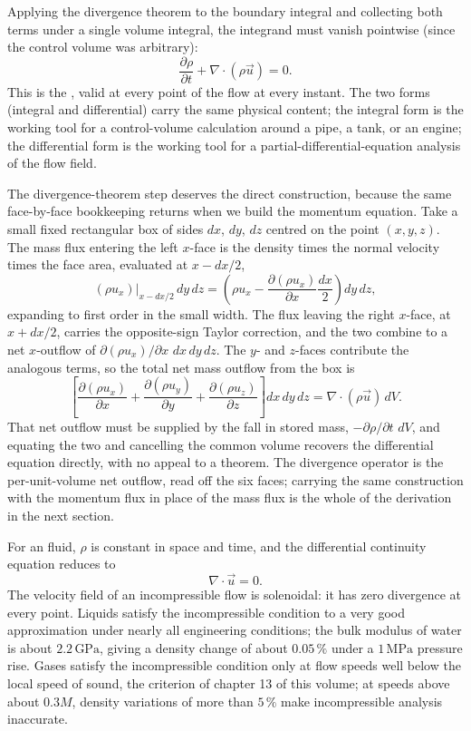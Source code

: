 Applying the divergence theorem to the boundary integral and
collecting both terms under a single volume integral, the integrand
must vanish pointwise (since the control volume was arbitrary):
\[
\frac{\partial \rho}{\partial t} + \nabla\cdot(\rho\vec{u}) = 0.
\]
This is the , valid at
every point of the flow at every instant. The two forms (integral
and differential) carry the same physical content; the integral
form is the working tool for a control-volume calculation around a
pipe, a tank, or an engine; the differential form is the working
tool for a partial-differential-equation analysis of the flow
field.

The divergence-theorem step deserves the direct construction, because
the same face-by-face bookkeeping returns when we build the momentum
equation. Take a small fixed rectangular box of sides $dx$, $dy$, $dz$
centred on the point $(x,y,z)$. The mass flux entering the left
$x$-face is the density times the normal velocity times the face area,
evaluated at $x - dx/2$,
\[
\left(\rho u_x\right)\Big|_{x-dx/2}\,dy\,dz
= \left(\rho u_x - \frac{\partial(\rho u_x)}{\partial x}\frac{dx}{2}
\right)dy\,dz,
\]
expanding to first order in the small width. The flux leaving the
right $x$-face, at $x + dx/2$, carries the opposite-sign Taylor
correction, and the two combine to a net $x$-outflow of
$\partial(\rho u_x)/\partial x\,\,dx\,dy\,dz$. The $y$- and $z$-faces
contribute the analogous terms, so the total net mass outflow from the
box is
\[
\left[\frac{\partial(\rho u_x)}{\partial x}
+ \frac{\partial(\rho u_y)}{\partial y}
+ \frac{\partial(\rho u_z)}{\partial z}\right]dx\,dy\,dz
= \nabla\cdot(\rho\vec u)\,dV.
\]
That net outflow must be supplied by the fall in stored mass,
$-\partial\rho/\partial t\,\,dV$, and equating the two and cancelling
the common volume recovers the differential equation directly, with no
appeal to a theorem. The divergence operator is the per-unit-volume net
outflow, read off the six faces; carrying the same construction with
the momentum flux in place of the mass flux is the whole of the
derivation in the next section.

For an  fluid, $\rho$ is constant in space
and time, and the differential continuity equation reduces to
\[
\nabla\cdot\vec{u} = 0.
\]
The velocity field of an incompressible flow is solenoidal: it has
zero divergence at every point. Liquids satisfy the incompressible
condition to a very good approximation under nearly all engineering
conditions; the bulk modulus of water is about $2.2\,\text{GPa}$,
giving a density change of about $0.05\,\%$ under a $1\,\text{MPa}$
pressure rise. Gases satisfy the incompressible condition only at
flow speeds well below the local speed of sound, the criterion of
chapter 13 of this volume; at speeds above about $0.3 M$, density
variations of more than $5\,\%$ make incompressible analysis
inaccurate.

